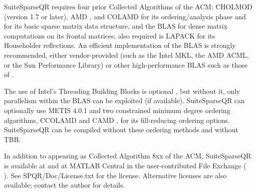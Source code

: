 \documentclass[12pt]{article}
\begin{document}
SuiteSparseQR requires four prior Collected Algorithms of the ACM: CHOLMOD
\cite{ChenDavisHagerRajamanickam09,DavisHager09} (version 1.7 or later), AMD
\cite{AmestoyDavisDuff96,AmestoyDavisDuff03}, and COLAMD
\cite{DavisGilbertLarimoreNg00_algo,DavisGilbertLarimoreNg00} for its
ordering/analysis phase and for its basic sparse matrix data structure, and the
BLAS \cite{dddh:90} for dense matrix computations on its frontal matrices; also
required is LAPACK \cite{LAPACK} for its Householder reflections.  An efficient
implementation of the BLAS is strongly recommended, either vendor-provided
(such as the Intel MKL, the AMD ACML, or the Sun Performance Library) or other
high-performance BLAS such as those of \cite{GotoVanDeGeijn08}.

The use of Intel's Threading Building Blocks is optional \cite{Reinders07}, but
without it, only parallelism within the BLAS can be exploited (if available).
Suite\-SparseQR can optionally use METIS 4.0.1 \cite{KarypisKumar98e} and two
constrained minimum degree ordering algorithms, CCOLAMD and CAMD
\cite{ChenDavisHagerRajamanickam09}, for its fill-reducing ordering options.
SuiteSparseQR can be compiled without these ordering methods and without TBB.

In addition to appearing as Collected Algorithm 8xx of the ACM, SuiteSparseQR
is available at
and at MATLAB Central
in the user-contributed File Exchange (
).
See SPQR/Doc/License.txt for the license.
Alternative licenses are also
available; contact the author for details.




\end{document}
